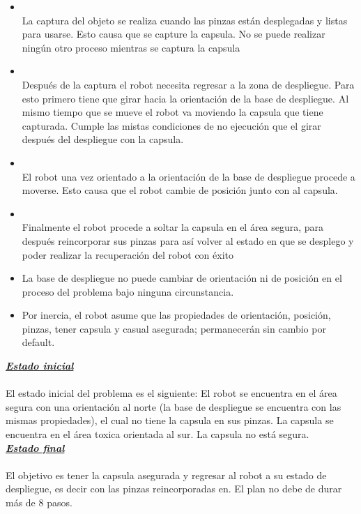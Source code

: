 \documentclass[letterpaper ,10pt]{article}
\begin{document}
{{\begin{itemize}
\item {}
\\
La captura del objeto se realiza cuando las pinzas están desplegadas y listas para usarse. Esto causa que se capture la capsula. No se puede realizar ningún otro proceso mientras se captura la capsula

\item {}
\\
Después de la captura el robot necesita regresar a la zona de despliegue. Para esto primero tiene que girar hacia la orientación de la base de despliegue. Al mismo tiempo que se mueve el robot va moviendo la capsula que tiene capturada. Cumple las mistas condiciones de no ejecución que el girar después del despliegue con la capsula.

\item {}
\\
El robot una vez orientado a la orientación de la base de despliegue procede a moverse. Esto causa que el robot cambie de posición junto con al capsula.

\item {}
\\
Finalmente el robot procede a soltar la capsula en el área segura, para después reincorporar sus pinzas para así volver al estado en que se desplego y poder realizar la recuperación del robot con éxito

\bigskip
\item La base de despliegue no puede cambiar de orientación ni de posición en el proceso del problema bajo ninguna circunstancia.
\item Por inercia, el robot asume que las propiedades de orientación, posición, pinzas, tener capsula y casual asegurada; permanecerán sin cambio por default.
\end{itemize}


\textbf{\noindent \ul{\textsl{Estado inicial} }}
\\
\\
El estado inicial del problema es el siguiente: El robot se encuentra en el área segura con una orientación al norte (la base de despliegue se encuentra con las mismas propiedades), el cual no tiene la capsula en sus pinzas. La capsula se encuentra en el área toxica orientada al sur. La capsula no está segura.
\vspace{0.5cm}
\\
\textbf{\noindent \ul{\textsl{Estado final} }}
\\
\\
El objetivo es tener la capsula asegurada y regresar al robot a su estado de despliegue, es decir con las pinzas reincorporadas en. El plan no debe de durar más de 8 pasos.
\\

}}
\end{document}

